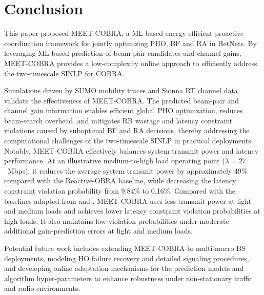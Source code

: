 \documentclass[10pt,journal,letterpaper]{IEEEtran}
\newcommand{\rev}[1]{\textcolor{revisioncolor}{{}#1}}
\newcommand{\omitted}[1]{}
\theoremstyle{remark}
\begin{document}
\section{Conclusion}

This paper proposed MEET-COBRA, a ML-based energy-efficient proactive coordination framework for jointly optimizing PHO, BF and RA in HetNets.
By leveraging ML-based prediction of beam-pair candidates and channel gains, MEET-COBRA provides a low-complexity online approach to efficiently address the two-timescale SINLP for COBRA.

Simulations driven by SUMO mobility traces and Sionna RT channel data validate the effectiveness of MEET-COBRA.
\omitted{}\rev{The} predicted beam-pair and channel gain information enables efficient global PHO optimization, reduces beam-search overhead, and mitigates RB wastage and latency constraint violations caused by suboptimal BF and RA decisions, thereby addressing the computational challenges of the two-timescale SINLP in practical deployments. 
Notably, MEET-COBRA effectively balances system transmit power and \omitted{}\rev{latency performance}\omitted{}\rev{. At} an illustrative medium-to-high load operating point ($\lambda=27$~Mbps), it reduces the average system transmit power by approximately \omitted{}\rev{49\%} compared with the Reactive-OBRA baseline, while decreasing the latency constraint violation probability from \omitted{}\rev{9.84\% to 0.16\%}.
\rev{Compared with the baselines adapted from \cite{wang2024joint} and \cite{heydarian2025multitimescale}, MEET-COBRA uses less transmit power at light and medium loads and achieves lower latency constraint violation probabilities at high loads.}
\rev{It also maintains low violation probabilities under moderate additional gain-prediction errors at light and medium loads.}

Potential future work includes extending MEET-COBRA to multi-macro BS deployments, \omitted{}\rev{modeling HO failure recovery and detailed signaling procedures}, and developing online adaptation mechanisms for the prediction models and algorithm hyper-parameters to enhance robustness under non-stationary traffic and radio environments.




%
\end{document}
